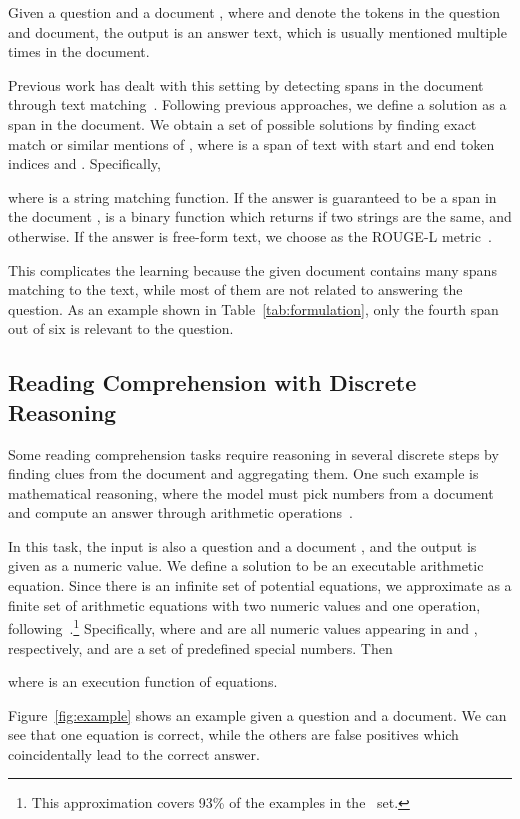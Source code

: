 \documentclass[11pt,a4paper]{article}
\begin{document}
Given a question  and a document , where  and  denote the tokens in the question and document, the output  is an answer text, which is usually mentioned multiple times in the document.

Previous work has dealt with this setting by detecting spans in the document through text matching~\citep{triviaqa, clark2018multi}.
Following previous approaches, we define a solution  as a span in the document. We obtain a set of possible solutions  by finding exact match or similar mentions of , where  is a span of text with start and end token indices  and . Specifically,

where  is a string matching function. If the answer is guaranteed to be a span in the document ,  is a binary function which returns  if two strings are the same, and  otherwise. If the answer is free-form text, we choose  as the ROUGE-L metric~\citep{lin2004rouge}.

This complicates the learning because the  given document contains many spans matching to the text, while most of them are not related to answering the question. As an example shown in Table~\ref{tab:formulation}, only the fourth span out of six is relevant to the question.


\subsection{Reading Comprehension with Discrete Reasoning}\label{subsec:drop-setup}
Some reading comprehension tasks require reasoning in several discrete steps by finding clues from the document and aggregating them. One such example is mathematical reasoning, where the model must pick numbers from a document and compute an answer through arithmetic operations~\cite{drop}. 


In this task, the input is also a question  and a document , and the output  is given as a numeric value. We define a solution  to be an executable arithmetic equation. Since there is an infinite set of potential equations, we approximate  as a finite set of arithmetic equations with two numeric values and one operation, following~\citet{drop}.\footnote{This approximation covers 93\% of the examples in the \dev\ set.} Specifically, 
where  and  are all numeric values appearing in  and , respectively, and  are a set of predefined special numbers. Then

where  is an execution function of equations.

Figure~\ref{fig:example} shows an example  given a question and a document. We can see that one equation is correct, while the others are false positives which coincidentally lead to the correct answer.
\end{document}
